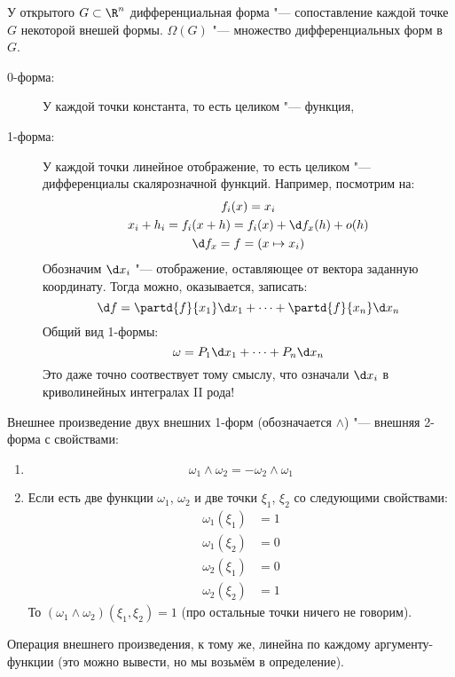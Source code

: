 \begin{Def}
	У открытого $G \subset \R^n$ дифференциальная форма "--- сопоставление каждой точке $G$ некоторой внешей формы.
	$\Omega(G)$ "--- множество дифференциальных форм в $G$.
\end{Def}
\begin{exmp}\begin{description}
\item[0-форма:]
	У каждой точки константа, то есть целиком "--- функция,

\item[1-форма:]
	У каждой точки линейное отображение, то есть целиком "--- дифференциалы скалярозначной функций.
	Например, посмотрим на:
	\begin{gather*}
		f_i(x) = x_i \\
		x_i + h_i = f_i(x + h) = f_i(x) + \d f_x(h) + o(h) \\
		\d f_x = f = (x \mapsto x_i)
	\end{gather*}
	Обозначим $\d x_i$ "--- отображение, оставляющее от вектора заданную координату.
	Тогда можно, оказывается, записать:
	\[ \d f = \partd{f}{x_1} \d x_1 + \dots + \partd{f}{x_n} \d x_n \]
	Общий вид 1-формы:
	\[ \omega = P_1 \d x_1 + \dots + P_n \d x_n \]
	Это даже точно соотвествует тому смыслу, что означали $\d x_i$ в криволинейных интегралах II рода!
\end{description}\end{exmp}

\begin{Def}
	Внешнее произведение двух внешних 1-форм (обозначается $\wedge$) "--- внешняя 2-форма с свойствами:
	\begin{enumerate}
	\item
		\[ \omega_1 \wedge \omega_2 = - \omega_2 \wedge \omega_1 \]
	
	\item
		Если есть две функции $\omega_1$, $\omega_2$ и две точки $\xi_1$, $\xi_2$ со следующими свойствами:
		\begin{align*}
			\omega_1(\xi_1) &= 1 \\
			\omega_1(\xi_2) &= 0 \\
			\omega_2(\xi_1) &= 0 \\
			\omega_2(\xi_2) &= 1
		\end{align*}
		То $(\omega_1 \wedge \omega_2)(\xi_1, \xi_2) = 1$ (про остальные точки ничего не говорим).
	\end{enumerate}
	Операция внешнего произведения, к тому же, линейна по каждому аргументу-функции (это можно вывести, но мы возьмём в определение).
\end{Def}

